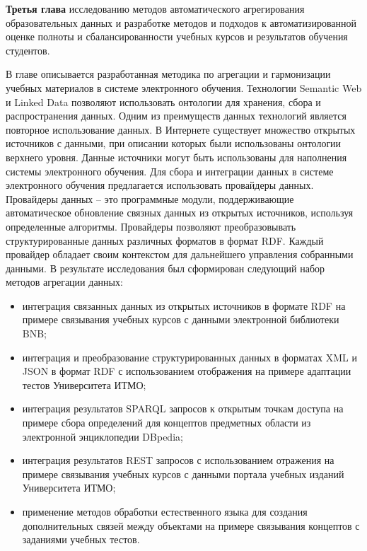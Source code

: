 \textbf{Третья глава} исследованию методов автоматического агрегирования образовательных данных и разработке методов и подходов к автоматизированной оценке полноты и сбалансированности учебных курсов и результатов обучения студентов.  

В главе описывается разработанная методика по агрегации и гармонизации учебных материалов в системе электронного обучения. Технологии Semantic Web и Linked Data позволяют использовать онтологии для хранения, сбора и распространения данных. Одним из преимуществ данных технологий является повторное использование данных. В Интернете существует множество открытых источников с данными, при описании которых были использованы онтологии верхнего уровня. Данные источники могут быть использованы для наполнения системы электронного обучения. Для сбора и интеграции данных в системе электронного обучения предлагается использовать провайдеры данных. Провайдеры данных -- это программные модули, поддерживающие автоматическое обновление связных данных из открытых источников, используя определенные алгоритмы. Провайдеры позволяют преобразовывать структурированные данных различных форматов в формат RDF. Каждый провайдер обладает своим контекстом для дальнейшего управления собранными данными. В результате исследования был сформирован следующий набор методов агрегации данных:

\begin{itemize}
\item интеграция связанных данных из открытых источников в формате RDF на примере связывания учебных курсов с данными электронной библиотеки BNB;
\item интеграция и преобразование структурированных данных в форматах XML и JSON в формат RDF с использованием отображения на примере адаптации тестов Университета ИТМО;
\item интеграция результатов SPARQL запросов к открытым точкам доступа на примере сбора определений для концептов предметных области из электронной энциклопедии DBpedia;
\item интеграция результатов REST запросов с использованием отражения на примере связывания учебных курсов с данными портала учебных изданий Университета ИТМО;
\item применение методов обработки естественного языка для создания дополнительных связей между объектами на примере связывания концептов с заданиями учебных тестов.
\end{itemize}

